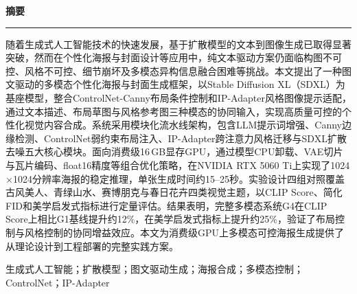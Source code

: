 \documentclass[12pt,a4paper]{ctexart}
\begin{document}
\thispagestyle{fancy}

\newpage
\thispagestyle{empty}
\vspace*{4cm}
\begin{center}
{\color{primary}\LARGE\bfseries 摘\quad 要}\\[14pt]
\color{secondary}\rule{0.35\textwidth}{0.6pt}
\end{center}
\vspace{1.2cm}
\begin{minipage}{0.88\textwidth}
\normalsize
随着生成式人工智能技术的快速发展，基于扩散模型的文本到图像生成已取得显著突破，然而在个性化海报与封面设计等应用中，纯文本驱动方案仍面临构图不可控、风格不可控、细节崩坏及多模态异构信息融合困难等挑战。本文提出了一种图文驱动的多模态个性化海报与封面生成框架，以Stable Diffusion XL（SDXL）为基座模型，整合ControlNet-Canny布局条件控制和IP-Adapter风格图像提示适配，通过文本描述、布局草图与风格参考图三种模态的协同输入，实现高质量可控的个性化视觉内容合成。系统采用模块化流水线架构，包含LLM提示词增强、Canny边缘检测、ControlNet弱约束布局注入、IP-Adapter跨注意力风格迁移与SDXL扩散去噪五大核心模块。面向消费级16\,GB显存GPU，通过模型CPU卸载、VAE切片与瓦片编码、float16精度等组合优化策略，在NVIDIA RTX 5060 Ti上实现了1024$\times$1024分辨率海报的稳定推理，单张生成时间约15--25秒。实验设计四组对照覆盖古风美人、青绿山水、赛博朋克与春日花卉四类视觉主题，以CLIP Score、简化FID和美学启发式指标进行定量评估。结果表明，完整多模态系统G4在CLIP Score上相比G1基线提升约12\%，在美学启发式指标上提升约25\%，验证了布局控制与风格控制的协同增益效应。本文为消费级GPU上多模态可控海报生成提供了从理论设计到工程部署的完整实践方案。

\vspace{16pt}
生成式人工智能；扩散模型；图文驱动生成；海报合成；多模态控制；ControlNet；IP-Adapter
\end{minipage}
\vfill\vspace*{0pt}
\end{document}
